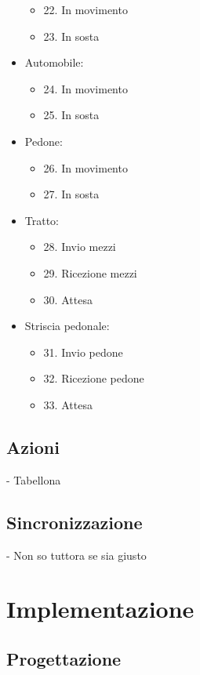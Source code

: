 \documentclass{article}
\newcommand{\Versione}{1.0}
\begin{document}
\begin{itemize}
\begin{itemize}
\item {22.} In movimento
\item {23.} In sosta
\end{itemize}
\item {Automobile:}
\begin{itemize}
\item {24.} In movimento
\item {25.} In sosta
\end{itemize}
\item {Pedone:}
\begin{itemize}
\item {26.} In movimento
\item {27.} In sosta
\end{itemize}
\item {Tratto:}
\begin{itemize}
\item {28.} Invio mezzi
\item {29.} Ricezione mezzi
\item {30.} Attesa
\end{itemize}
\item {Striscia pedonale:}
\begin{itemize}
\item {31.} Invio pedone
\item {32.} Ricezione pedone
\item {33.} Attesa
\end{itemize}
\end{itemize}
\subsection{Azioni}
- Tabellona
\subsection{Sincronizzazione}
- Non so tuttora se sia giusto

\newpage

\pagestyle{fancy}

\chead{}
\rhead{
	\color{black}
	\bfseries \textsf{\normalsize v.\Versione\\} 
}

\section{Implementazione}
\subsection{Progettazione}
\end{document}

